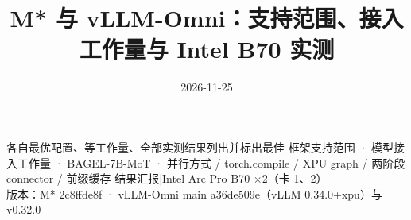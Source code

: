 \documentclass[aspectratio=169,10pt]{beamer}
\title{M* 与 vLLM-Omni：支持范围、接入工作量与 Intel B70 实测}
\date{2026-11-25}
\begin{document}
%
  {各自最优配置、等工作量、全部实测结果列出并标出最佳}%
  {框架支持范围 · 模型接入工作量 · BAGEL-7B-MoT · 并行方式 / torch.compile / XPU graph / 两阶段 connector / 前缀缓存}%
  {结果汇报\quad|\quad Intel Arc Pro B70 $\times$2（卡 1、2）\\版本：M* 2c8ffde8f · vLLM-Omni main a36de509e（vLLM 0.34.0+xpu）与 v0.32.0}









\end{document}
